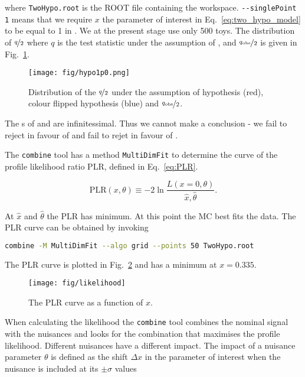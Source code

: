 \noindent where \lstinline[language=sh]|TwoHypo.root| is the ROOT file containing the workspace. \lstinline[language=sh]|--singlePoint 1| means that we require $x$ \textendash the parameter of interest in Eq.~\ref{eq:two_hypo_model} to be equal to 1 in \Halt. We at the present stage use only 500 toys. The distribution of $\nicefrac{q}{2}$ where $q$ is the test statistic under the assumption of \Hnull, \Halt and $\nicefrac{q_{\text{obs}}}{2}$ is given in Fig.~\ref{fig:hypo1p0}.

\begin{figure}
  \centering
  \texttt{[image: fig/hypo1p0.png]}
  \caption{Distribution of the $\nicefrac{q}{2}$ under the assumption of \ttbar hypothesis (red), colour flipped \ttbar hypothesis (blue) and $\nicefrac{q_{\text{obs}}}{2}$.}
  \label{fig:hypo1p0}
\end{figure}

The \pval s of \Halt and \Hnull are infinitessimal. Thus we cannot make a conclusion - we fail to reject \Hnull in favour of \Halt and fail to rejet \Halt in favour of \Hnull.

The \lstinline[language=sh]|combine| tool has a method \lstinline[language=sh]|MultiDimFit| to determine the curve of the profile likelihood ratio PLR, defined in Eq.~\ref{eq:PLR}.

\begin{equation}
  \text{PLR}(x, \theta)\equiv-2\ln\frac{L(x=0, \theta)}{\hat{x}, \hat{\theta}}.
  \label{eq:PLR}              
\end{equation}

At $\hat{x}$ and $\hat{\theta}$ the PLR has minimum. At this point the MC best fits the data. The PLR curve can be obtained by invoking

\begin{lstlisting}[language=sh, breaklines=true]
combine -M MultiDimFit --algo grid --points 50 TwoHypo.root
\end{lstlisting}

The PLR curve is plotted in Fig.~\ref{fig:likelihood} and has a minimum at $x=0.335$.

\begin{figure}
  \centering
  \texttt{[image: fig/likelihood]}
  \caption{The PLR curve as a function of $x$.}
  \label{fig:likelihood}
\end{figure}

When calculating the likelihood the \lstinline[language=sh]|combine| tool combines the nominal signal with the nuisances and looks for the combination that maximises the profile likelihood. Different nuisances have a different impact. The impact of a nuisance parameter $\theta$ is defined as the shift $\Delta x$ in the parameter of interest when the nuisance is included at its $\pm\sigma$ values


